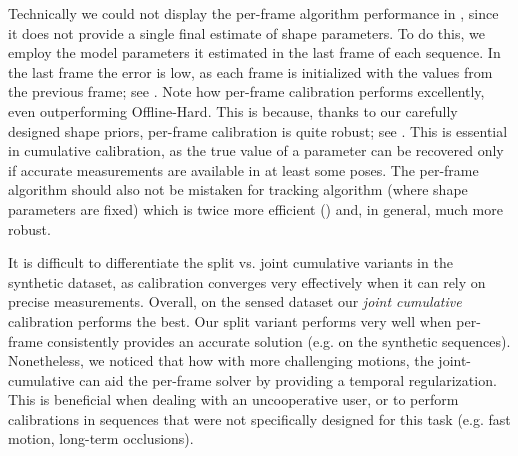 \begin{edit}
Technically we could not display the per-frame algorithm performance in , since it does not provide a single final estimate of shape parameters. To do this, we employ the model parameters it estimated in the last frame of each sequence. In the last frame the error is low, as each frame is initialized with the values from the previous frame; see \VideoReal{}. Note how per-frame calibration performs excellently, even outperforming Offline-Hard. This is because, thanks to our carefully designed shape priors, per-frame calibration is quite robust; see \VideoReal{}. This is essential in cumulative calibration, as the true value of a parameter can be recovered only if accurate measurements are available in at least some poses. The per-frame algorithm should also not be mistaken for tracking algorithm (where shape parameters are fixed) which is twice more efficient () and, in general, much more robust.
\end{edit}


It is difficult to differentiate the split vs. joint  cumulative variants in the synthetic dataset, as calibration converges very effectively when it can rely on precise measurements. 
Overall, on the sensed dataset our \emph{joint cumulative} calibration performs the best. Our split variant performs very well when per-frame consistently provides an accurate solution (e.g. on the synthetic sequences). Nonetheless, we noticed that how with more challenging motions, the joint-cumulative can aid the per-frame solver by providing a temporal regularization. This is beneficial when dealing with an uncooperative user, or to perform calibrations in sequences that were not specifically designed for this task (e.g. fast motion, long-term occlusions).

